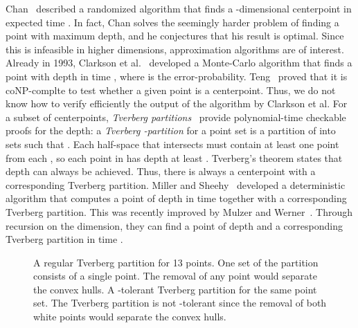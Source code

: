 \documentclass[oribibl,envcountsame,envcountsect]{llncs}
\begin{document}
Chan~\cite{Chan2004} described a randomized algorithm that
finds a -dimensional centerpoint in expected time
. In fact, Chan solves the seemingly harder problem of finding a
point with maximum depth, and he conjectures that his result is optimal.
Since this is infeasible in higher
dimensions, approximation algorithms are of interest. Already in 1993, Clarkson et
al.~\cite{Clarkson1996} developed a Monte-Carlo algorithm that finds a point
with depth  in time , where  is the error-probability.
Teng~\cite{Teng1992} proved that it is coNP-complte to test whether
a given point is a centerpoint. Thus, we do not know how to verify
efficiently the output of the algorithm by Clarkson et al. For a subset
of centerpoints, \emph{Tverberg partitions}~\cite{Tverberg1966} provide
polynomial-time checkable proofs for the depth: a \emph{Tverberg -partition} for a
point set  is a partition
 of  into  sets such
that .  Each half-space that
intersects  must contain at least one
point from each , so each point in  has
depth at least .
Tverberg's theorem states that depth  can always be
achieved.
Thus, there is always a centerpoint with a corresponding Tverberg partition.
Miller and Sheehy~\cite{Miller2010} developed
a deterministic algorithm that computes a
point of depth  in time  together
with a corresponding Tverberg partition. This was recently improved by Mulzer
and Werner~\cite{Mulzer2013}. Through recursion on the dimension, they can find
a point of depth  and a corresponding Tverberg partition
in time .

\begin{figure}[htbp]
  \newcommand{\imgwidth}{0.42\textwidth}
  \begin{center}
    \hspace{1cm}
  \end{center}
  \caption{
     A regular Tverberg partition
    for 13 points. One set of the partition consists of
    a single point. The removal of any point would separate the
    convex hulls.
     A -tolerant Tverberg partition
    for the same point set. The Tverberg partition is not
    -tolerant since the removal of both white points would
    separate the convex hulls.
  }
  \label{intro:fig:tolex}
\end{figure}
\end{document}
